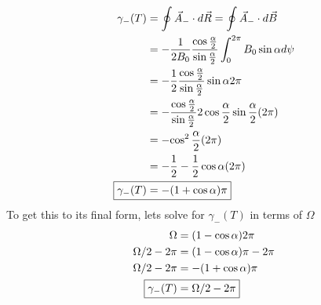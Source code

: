\documentclass{jhwhw}
\begin{document}
\begin{align}
    \gamma_-(T)
    &=
    \oint \vec{A}_-\cdot d \vec{R} = \oint \vec{A}_-\cdot d \vec{B}
    \\
    &=
    -\frac{1}{2B_0} 
    \frac
    {\cos{\frac{\alpha}{2}}}
    {\sin{\frac{\alpha}{2}}} 
    \int_{0}^{2\pi}
    B_{0} \sin{\alpha} d \psi
    \\
    &=
    -\frac{1}{2} 
    \frac
    {\cos{\frac{\alpha}{2}}}
    {\sin{\frac{\alpha}{2}}} 
    \sin{\alpha} 2 \pi
    \\
    &=
    -
    \frac
    {\cos{\frac{\alpha}{2}}}
    {\sin{\frac{\alpha}{2}}} 
    2\cos{\frac{\alpha}{2}}\sin{\frac{\alpha}{2}} (2 \pi)
    \\
    &=
    -
    {\cos^2{\frac{\alpha}{2}}}(2 \pi)
    \\
    &=
    -
    {\frac{1}{2}-\frac{1}{2}\cos{\alpha}}(2 \pi)
    \\
    \Aboxed{
    \gamma_-(T)
    &=
    -({1+\cos{\alpha}})\pi
    }
\end{align}
To get this to its final form, lets solve for $\gamma_-(T)$ in terms of $\Omega$
\begin{align}
    \Omega &= (1 - \cos{\alpha}) 2 \pi
    \\
    \Omega / 2 - 2 \pi &= (1 - \cos{\alpha}) \pi - 2\pi
    \\
    \Omega / 2 - 2 \pi &= -({1+\cos{\alpha}})\pi
    \\
    \Aboxed{
    \gamma_-(T)
    &=
    \Omega / 2 - 2 \pi
    }
\end{align}
\pagebreak[4]
\end{document}
